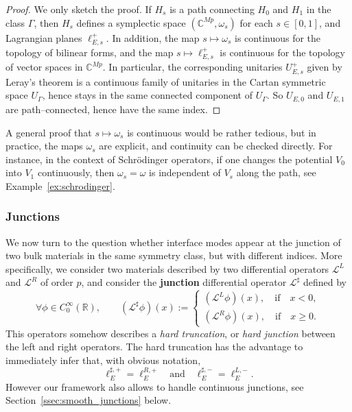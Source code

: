 \documentclass[11pt]{amsart}
\numberwithin{equation}{section} %
\newcommand\1{{\mathds 1}}
\def\C{{\mathbb C}}
\def\R{{\mathbb R}}
\def\cL{{\mathcal L}}
\begin{document}
\begin{proof}
    We only sketch the proof. If $H_s$ is a path connecting $H_0$ and $H_1$ in the class $\Gamma$, then $H_s$ defines a symplectic space $(\C^{Mp}, \omega_s)$ for each $s \in [0, 1]$, and Lagrangian planes $\ell_{E, s}^+$. In addition, the map $s \mapsto \omega_s$ is continuous for the topology of bilinear forms, and the map $s \mapsto \ell_{E, s}^+$ is continuous for the topology of vector spaces in $\C^{Mp}$. In particular, the corresponding unitaries $U_{E, s}^+$ given by Leray's theorem is a continuous family of unitaries in the Cartan symmetric space $U_\Gamma$, hence stays in the same connected component of $U_\Gamma$. So $U_{E,0}$ and $U_{E, 1}$ are path--connected, hence have the same index.
\end{proof}

A general proof that $s \mapsto \omega_s$ is continuous would be rather tedious, but in practice, the maps $\omega_s$ are explicit, and continuity can be checked directly. For instance, in the context of Schrödinger operators, if one changes the potential $V_0$ into $V_1$ continuously, then $\omega_s = \omega$ is independent of $V_s$ along the path, see Example~\ref{ex:schrodinger}.


\subsubsection{Junctions}

We now turn to the question whether interface modes appear at the junction of two bulk materials in the same symmetry class, but with different indices. More specifically, we consider two materials described by two differential operators $\cL^L$ and $\cL^R$ of order $p$, and consider the {\bf junction} differential operator $\cL^\sharp$ defined by
\[
    \forall \phi \in C^\infty_0(\R), \qquad (\cL^\sharp \phi)(x) := \begin{cases}
        (\cL^L \phi)(x), \quad \text{if} \quad x < 0, \\
        (\cL^R \phi)(x), \quad \text{if} \quad x \ge 0.
    \end{cases}
\]
This operators somehow describes a {\em hard truncation}, or {\em hard junction} between the left and right operators. The hard truncation has the advantage to immediately infer that, with obvious notation,
\begin{equation} \label{eq:ell_Esharp=ell_ER}
    \ell_E^{\sharp, +} = \ell_E^{R, +} \quad \text{and} \quad \ell_E^{\sharp, -} = \ell_E^{L, -}.
\end{equation}
However our framework also allows to handle continuous junctions, see Section~\ref{ssec:smooth_junctions} below.
\end{document}
